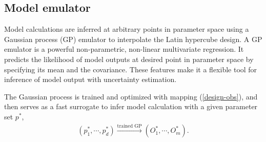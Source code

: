 \documentclass[aps,prl,twocolumn,groupedaddress]{revtex4-1}
\begin{document}
	\subsection{Model emulator}
	Model calculations are inferred at arbitrary points in parameter space using a Gaussian process (GP) emulator to interpolate the Latin hypercube design. 
	A GP emulator is a powerful non-parametric, non-linear multivariate regression. 
	It predicts the likelihood of model outputs at desired point in parameter space by specifying its mean and the covariance.
	These features make it a flexible tool for inference of model output with uncertainty estimation.
	
	 The Gaussian process is trained and optimized with mapping (\ref{design-obs}), and then serves as a fast surrogate to infer model calculation with a given parameter set $p^*$,
	 \begin{eqnarray}
	 	(p^*_1, \cdots, p^*_d) \xrightarrow{\textrm{trained GP}} (O^*_1, \cdots, O^*_m).
	 \end{eqnarray}
	 
\end{document}
